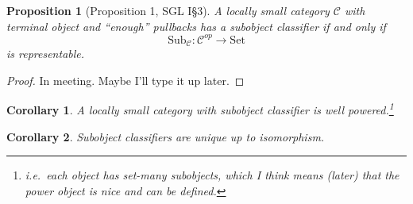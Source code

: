 \documentclass[a4paper]{article}
\newcommand{\Set}{\mathrm{Set}}
\newcommand{\Sub}{\mathrm{Sub}}
\newtheorem{prop}[theorem]{Proposition}
\newtheorem{corollary}{Corollary}[theorem]
\theoremstyle{definition}
\theoremstyle{remark}
\begin{document}
\begin{prop}[Proposition 1, SGL I\S3]
    A locally small category $\mathcal C$ with terminal object and ``enough'' pullbacks has a subobject classifier if and only if
    \[ \Sub_{\mathcal C} \colon \mathcal C^{op} \rightarrow \Set \]
    is representable.
\end{prop}
\begin{proof}
    In meeting. Maybe I'll type it up later.
\end{proof}

\begin{corollary}
    A locally small category with subobject classifier is well powered.\footnote{i.e.\ each object has set-many subobjects, which I think means (later) that the power object is nice and can be defined.}
\end{corollary}

\begin{corollary}
    Subobject classifiers are unique up to isomorphism.
\end{corollary}
\end{document}
